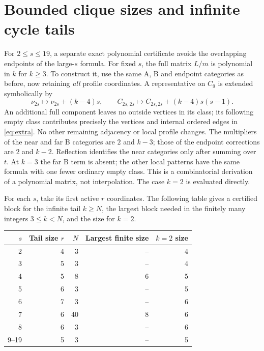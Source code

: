 \documentclass[11pt]{article}
\theoremstyle{remark}\newtheorem{remark}[theorem]{Remark}
\begin{document}
\section{Bounded clique sizes and infinite cycle tails}
For $2\le s\le19$, a separate exact polynomial certificate
avoids the overlapping endpoints of the large-$s$ formula.
For fixed $s$, the full matrix $L/m$ is polynomial in $k$ for
$k\ge3$. To construct it, use the same A, B and endpoint categories
as before, now retaining \emph{all} profile coordinates.
A representative on $C_9$ is extended symbolically by
\begin{equation}
 \nu_{2s}\longmapsto\nu_{2s}+(k-4)s,\qquad
 C_{2s,2s}\longmapsto C_{2s,2s}+(k-4)s(s-1).           \label{eq:extra}
\end{equation}
An additional full component leaves no outside vertices in its
class; its following empty class contributes precisely the
vertices and internal ordered edges in \eqref{eq:extra}.
No other remaining adjacency or local profile changes.
The multipliers of the near and far B categories are $2$ and
$k-3$; those of the endpoint corrections are $2$ and $k-2$.
Reflection identifies the near categories only after summing
over $t$. At $k=3$ the far B term is absent; the other local
patterns have the same formula with one fewer ordinary empty class.
This is a combinatorial derivation of a polynomial matrix,
not interpolation. The case $k=2$ is evaluated directly.

For each $s$, take its first active $r$ coordinates.
The following table gives a certified block for the infinite
tail $k\ge N$, the largest block needed in the finitely many
integers $3\le k<N$, and the size for $k=2$.
\begin{center}
\begin{tabular}{@{}rrrrr@{}}
\toprule
$s$ & Tail size $r$ & $N$ & Largest finite size & $k=2$ size\\
\midrule
2 &4&3&--&4\\
3 &5&3&--&4\\
4 &5&8&6&5\\
5 &6&3&--&5\\
6 &7&3&--&6\\
7 &6&40&8&6\\
8 &6&3&--&6\\
9--19 &5&3&--&5\\
\bottomrule
\end{tabular}                                                     \label{tab:small}
\end{center}
\end{document}
